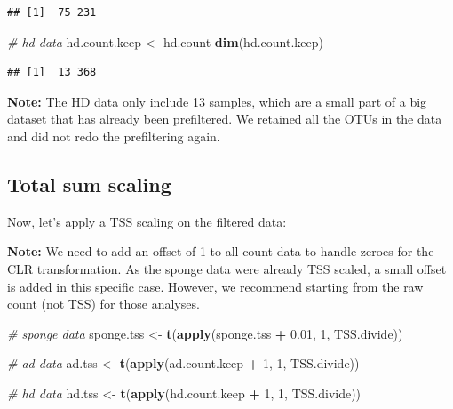 \documentclass[]{book}
\newenvironment{Shaded}{\begin{snugshade}}{\end{snugshade}}
\newcommand{\KeywordTok}[1]{\textcolor[rgb]{0.13,0.29,0.53}{\textbf{#1}}}
\newcommand{\DecValTok}[1]{\textcolor[rgb]{0.00,0.00,0.81}{#1}}
\newcommand{\FloatTok}[1]{\textcolor[rgb]{0.00,0.00,0.81}{#1}}
\newcommand{\StringTok}[1]{\textcolor[rgb]{0.31,0.60,0.02}{#1}}
\newcommand{\CommentTok}[1]{\textcolor[rgb]{0.56,0.35,0.01}{\textit{#1}}}
\newcommand{\OperatorTok}[1]{\textcolor[rgb]{0.81,0.36,0.00}{\textbf{#1}}}
\newcommand{\NormalTok}[1]{#1}
\begin{document}
\begin{verbatim}
## [1]  75 231
\end{verbatim}

\begin{Shaded}
\begin{Highlighting}[]
\CommentTok{# hd data}
\NormalTok{hd.count.keep <-}\StringTok{ }\NormalTok{hd.count}
\KeywordTok{dim}\NormalTok{(hd.count.keep)}
\end{Highlighting}
\end{Shaded}

\begin{verbatim}
## [1]  13 368
\end{verbatim}

\textbf{Note:} The HD data only include 13 samples, which are a small
part of a big dataset that has already been prefiltered. We retained all
the OTUs in the data and did not redo the prefiltering again.

\subsection{Total sum scaling}\label{total-sum-scaling}

Now, let's apply a TSS scaling on the filtered data:

\textbf{Note:} We need to add an offset of 1 to all count data to handle
zeroes for the CLR transformation. As the sponge data were already TSS
scaled, a small offset is added in this specific case. However, we
recommend starting from the raw count (not TSS) for those analyses.

\begin{Shaded}
\begin{Highlighting}[]
\CommentTok{# sponge data}
\NormalTok{sponge.tss <-}\StringTok{ }\KeywordTok{t}\NormalTok{(}\KeywordTok{apply}\NormalTok{(sponge.tss }\OperatorTok{+}\StringTok{ }\FloatTok{0.01}\NormalTok{, }\DecValTok{1}\NormalTok{, TSS.divide))}

\CommentTok{# ad data}
\NormalTok{ad.tss <-}\StringTok{ }\KeywordTok{t}\NormalTok{(}\KeywordTok{apply}\NormalTok{(ad.count.keep }\OperatorTok{+}\StringTok{ }\DecValTok{1}\NormalTok{, }\DecValTok{1}\NormalTok{, TSS.divide))}

\CommentTok{# hd data}
\NormalTok{hd.tss <-}\StringTok{ }\KeywordTok{t}\NormalTok{(}\KeywordTok{apply}\NormalTok{(hd.count.keep }\OperatorTok{+}\StringTok{ }\DecValTok{1}\NormalTok{, }\DecValTok{1}\NormalTok{, TSS.divide))}
\end{Highlighting}
\end{Shaded}
\end{document}
